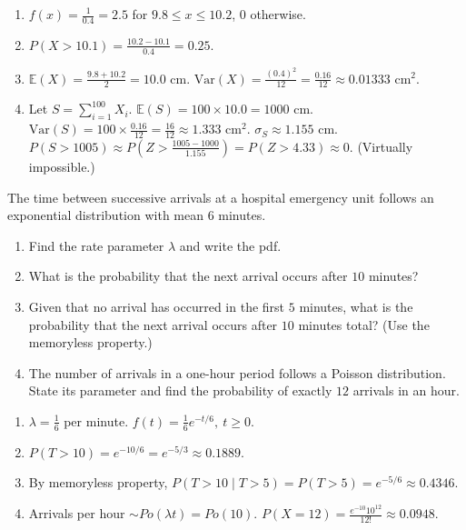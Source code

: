 \documentclass[11pt]{article}
\begin{document}
\begin{corrige}[Exercise 1]
\begin{enumerate}
\item $f(x)=\frac{1}{0.4}=2.5$ for $9.8\le x\le 10.2$, $0$ otherwise.
\item $P(X>10.1)=\frac{10.2-10.1}{0.4}=0.25$.
\item $\mathbb{E}(X)=\frac{9.8+10.2}{2}=10.0$ cm. $\mathrm{Var}(X)=\frac{(0.4)^2}{12}=\frac{0.16}{12}\approx 0.01333$ cm$^2$.
\item Let $S=\sum_{i=1}^{100} X_i$. $\mathbb{E}(S)=100\times10.0=1000$ cm. $\mathrm{Var}(S)=100\times\frac{0.16}{12}=\frac{16}{12}\approx 1.333$ cm$^2$. $\sigma_S\approx 1.155$ cm. $P(S>1005)\approx P\left(Z>\frac{1005-1000}{1.155}\right)=P(Z>4.33)\approx 0$. (Virtually impossible.)
\end{enumerate}
\end{corrige}

\begin{exercice}
The time between successive arrivals at a hospital emergency unit follows an exponential distribution with mean $6$ minutes.
\begin{enumerate}
\item Find the rate parameter $\lambda$ and write the pdf.
\item What is the probability that the next arrival occurs after $10$ minutes?
\item Given that no arrival has occurred in the first $5$ minutes, what is the probability that the next arrival occurs after $10$ minutes total? (Use the memoryless property.)
\item The number of arrivals in a one-hour period follows a Poisson distribution. State its parameter and find the probability of exactly $12$ arrivals in an hour.
\end{enumerate}
\end{exercice}

\begin{corrige}[Exercise 2]
\begin{enumerate}
\item $\lambda=\frac{1}{6}$ per minute. $f(t)=\frac{1}{6}e^{-t/6},\ t\ge0$.
\item $P(T>10)=e^{-10/6}=e^{-5/3}\approx 0.1889$.
\item By memoryless property, $P(T>10\mid T>5)=P(T>5)=e^{-5/6}\approx 0.4346$.
\item Arrivals per hour $\sim Po(\lambda t)=Po(10)$. $P(X=12)=\frac{e^{-10}10^{12}}{12!}\approx 0.0948$.
\end{enumerate}
\end{corrige}
\end{document}
